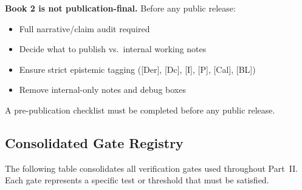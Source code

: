 \begin{tcolorbox}[colback=red!10!white, colframe=red!70!black,
    title=\textbf{Editorial Warning: Pre-Publication Review Required}]
\textbf{Book 2 is not publication-final.} Before any public release:
\begin{itemize}[nosep]
\item Full narrative/claim audit required
\item Decide what to publish vs.\ internal working notes
\item Ensure strict epistemic tagging ([Der], [Dc], [I], [P], [Cal], [BL])
\item Remove internal-only notes and debug boxes
\end{itemize}
A pre-publication checklist must be completed before any public release.
\end{tcolorbox}





\subsection{Consolidated Gate Registry}
\label{sec:gate_registry}

The following table consolidates all verification gates used throughout Part~II.
Each gate represents a specific test or threshold that must be satisfied.

